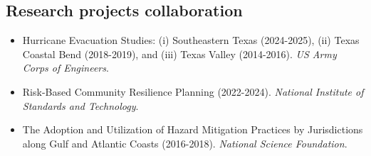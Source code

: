 \documentclass[11pt]{article}
\begin{document}
\subsection*{Research projects collaboration}
\begin{itemize}[leftmargin=20pt]
\item Hurricane Evacuation Studies: (i) Southeastern Texas (2024-2025), (ii) Texas Coastal Bend (2018-2019), and (iii) Texas Valley (2014-2016). \emph{US Army Corps of Engineers}.
\item Risk-Based Community Resilience Planning (2022-2024). \emph{National Institute of Standards and Technology}.
\item The Adoption and Utilization of Hazard Mitigation Practices by Jurisdictions along Gulf and Atlantic Coasts (2016-2018). \emph{National Science Foundation}.
\end{itemize}
\end{document}
